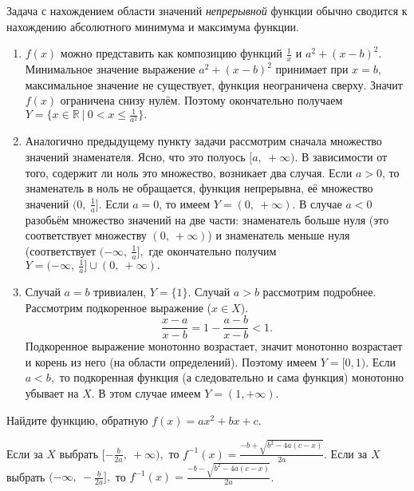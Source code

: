 \begin{solution}
Задача с нахождением области значений 
\textit{непрерывной} функции
обычно сводится к нахождению
абсолютного минимума и максимума функции.
\begin{enumerate}
\item $f(x)$ можно представить как композицию функций $\frac {1}{x}$ и
$a^2 + (x-b)^2.$
Минимальное значение выражение
${a^2 + (x-b)^2}$ принимает при $x=b,$ максимальное значение
не существует, функция неограничена сверху. Значит $f(x)$ ограничена
снизу нулём.
Поэтому окончательно получаем
$Y=\{x\in\mathbb{R}~|~0<x\le \frac{1}{a^2}\}.$
\item Аналогично предыдущему пункту задачи рассмотрим сначала множество значений
знаменателя. Ясно, что это полуось $[a,~+\infty).$ В зависимости от того, содержит
ли ноль это множество, возникает два случая. Если $a>0$, то знаменатель в ноль
не обращается, функция непрерывна, её множество значений $(0,~\frac{1}{a}].$
Если $a=0$, то имеем $Y=(0,~+\infty).$
В случае $a<0$ разобьём множество значений на две части: знаменатель больше нуля
(это соответствует множеству $(0,~+\infty)$) и знаменатель меньше нуля
(соответствует $(-\infty,~\frac{1}{a}],$ где окончательно получим
$Y=(-\infty,~\frac{1}{a}]\cup(0,~+\infty).$
\item Случай $a=b$ тривиален, $Y=\{1\}.$ Случай $a>b$ рассмотрим подробнее.
Рассмотрим подкоренное выражение
($x\in X$). $$\frac{x-a}{x-b} = 1 - \frac {a-b}{x-b}<1.$$
Подкоренное выражение монотонно возрастает, значит монотонно возрастает и корень
из него (на области определений). Поэтому имеем $Y=[0,1).$ Если $a<b,$ то
подкоренная функция (а следовательно и сама функция) монотонно убывает на $X.$
В этом случае имеем $Y=(1,+\infty).$
\end{enumerate}
\end{solution}
\begin{task}
Найдите функцию, обратную $f(x)=ax^2+bx+c.$
\end{task}
\begin{solution}
Если за $X$ выбрать $[-\frac{b}{2a},~+\infty),$
то $f^{-1}(x) = \frac{-b+\sqrt{b^2-4a(c-x)}}{2a}$.
Если за $X$ выбрать $(-\infty,~-\frac{b}{2a}],$
то $f^{-1}(x) = \frac{-b-\sqrt{b^2-4a(c-x)}}{2a}$.
\end{solution}
